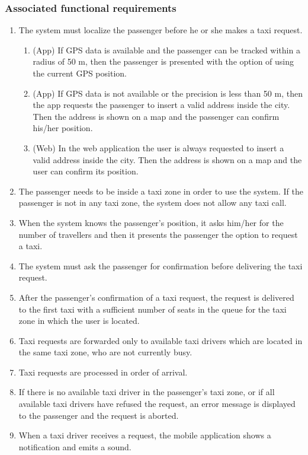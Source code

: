 \subsubsection{Associated functional requirements}
\begin{enumerate}
	\item The system must localize the passenger before he or she makes a taxi request.
	\begin{enumerate}
		\item (App) If GPS data is available and the passenger can be tracked within a radius of 50 m, then the passenger is presented with the option of using the current GPS position.
		\item (App) If GPS data is not available or the precision is less than 50 m, then the app requests the passenger to insert a valid address inside the city. Then the address is shown on a map and the passenger can confirm his/her position.
		\item (Web) In the web application the user is always requested to insert a valid address inside the city. Then the address is shown on a map and the user can confirm its position.
	\end{enumerate}
	\item The passenger needs to be inside a taxi zone in order to use the system. If the passenger is not in any taxi zone, the system does not allow any taxi call.
	\item When the system knows the passenger's position, it asks him/her for the number of travellers and then it presents the passenger the option to request a taxi.
	\item The system must ask the passenger for confirmation before delivering the taxi request.
	\item After the passenger's confirmation of a taxi request, the request is delivered to the first taxi with a sufficient number of seats in the queue for the taxi zone in which the user is located.
	\item Taxi requests are forwarded only to available taxi drivers which are located in the same taxi zone, who are not currently busy.
	\item Taxi requests are processed in order of arrival.
	\item If there is no available taxi driver in the passenger's taxi zone, or if all available taxi drivers have refused the request, an error message is displayed to the passenger and the request is aborted.
	\item When a taxi driver receives a request, the mobile application shows a notification and emits a sound.

\end{enumerate}
